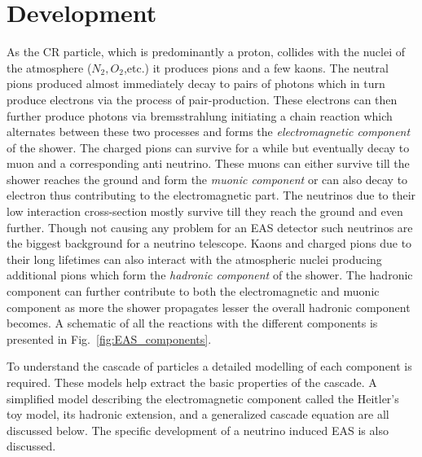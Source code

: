 \section{Development}
\label{sec:EAS_dev}

As the CR particle, which is predominantly a proton, collides with the nuclei of the atmosphere ($N_2, O_2 $,etc.) it produces pions and a few kaons. The neutral pions produced almost immediately decay to pairs of photons which in turn produce electrons via the process of pair-production. These electrons can then further produce photons via bremsstrahlung initiating a chain reaction which alternates between these two processes and forms the \textit{electromagnetic component} of the shower. The charged pions can survive for a while but eventually decay to muon and a corresponding anti neutrino. These muons can either survive till the shower reaches the ground and form the \textit{muonic component} or can also decay to electron thus contributing to the electromagnetic part. The neutrinos due to their low interaction cross-section mostly survive till they reach the ground and even further. Though not causing any problem for an EAS detector such neutrinos are the biggest background for a neutrino telescope. Kaons and charged pions due to their long lifetimes can also interact with the atmospheric nuclei producing additional pions which form the \textit{hadronic component} of the shower. The hadronic component can further contribute to both the electromagnetic and muonic component as more the shower propagates lesser the overall hadronic component becomes. A schematic of all the reactions with the different components is presented in Fig.~\ref{fig:EAS_components}.

To understand the cascade of particles a detailed modelling of each component is required. These models help extract the basic properties of the cascade. A simplified model describing the electromagnetic component called the Heitler's toy model, its hadronic extension, and a generalized cascade equation are all discussed below. The specific development of a neutrino induced EAS is also discussed.  

